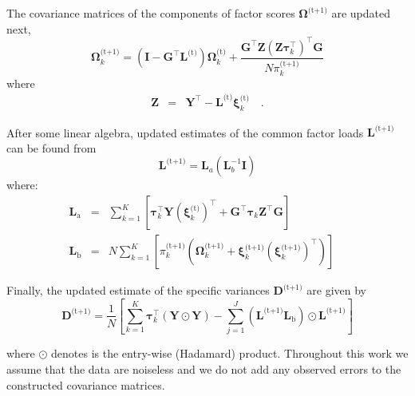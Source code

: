 \documentclass[twocolumn]{aastex62}
\newcommand{\vect}[1]{\boldsymbol{\mathbf{#1}}}
\renewcommand{\vec}[1]{\vect{#1}}
\newcommand{\weight}{\pi}
\newcommand{\data}{\textbf{Y}}
\newcommand{\vecdata}{\vec\data}
\newcommand{\nextstep}{^\textrm{(t+1)}}
\newcommand{\thisstep}{^\textrm{(t)}}
\newcommand{\transpose}{^\intercal}
\newcommand{\eye}{\textbf{I}}
\newcommand{\factorloads}{\textbf{L}}
\newcommand{\specificvariance}{\vec{D}}
\newcommand{\scoremeans}{\vec\xi}
\newcommand{\scorecovs}{\vec\Omega}
\newcommand{\NumData}{N}
\newcommand{\NumComponents}{K}
\newcommand{\numcomponents}{k}
\begin{document}
The covariance matrices of the components of factor scores $\scorecovs\nextstep$
are updated next,
\begin{equation}
	\scorecovs_\numcomponents\nextstep = \left(\eye - \vec{G}\transpose\factorloads\thisstep\right)\scorecovs_\numcomponents\thisstep + \frac{\vec{G}\transpose\vec{Z}\left(\vec{Z}\vec\tau_\numcomponents\transpose\right)\transpose\vec{G}}{N\weight_\numcomponents\nextstep}
\end{equation}
\noindent{}where
\begin{eqnarray}
	\vec{Z} &=& \vecdata\transpose - \factorloads\thisstep\scoremeans_\numcomponents\thisstep \quad .
\end{eqnarray}

After some linear algebra, updated estimates of the common factor loads $\factorloads\nextstep$
can be found from
\begin{equation}
	\factorloads\nextstep = \factorloads_{a}\left(\factorloads_{b}^{-1}\eye\right)
\end{equation}
\noindent{}where:
\begin{eqnarray}
	\factorloads_\textrm{a} &=& \sum_{\numcomponents=1}^{\NumComponents}\left[ \vec\tau_\numcomponents\transpose\vecdata\left(\scoremeans_\numcomponents\thisstep\right)\transpose + 
	\vec{G}\transpose\vec\tau_\numcomponents\vec{Z}\transpose\vec{G}\right] \\
	\factorloads_\textrm{b} &=& N\sum_{\numcomponents=1}^{\NumComponents}\left[\weight_\numcomponents\nextstep\left(\scorecovs_\numcomponents\nextstep + \scoremeans_\numcomponents\nextstep\left(\scoremeans_\numcomponents\nextstep\right)\transpose\right)\right] \quad
\end{eqnarray}


Finally, the updated estimate of the specific variances $\specificvariance\nextstep$ are given
by
\begin{equation}
	\specificvariance\nextstep = \frac{1}{\NumData}\left[\sum^{\NumComponents}_{\numcomponents=1}\vec\tau_\numcomponents\transpose\left(\vecdata\odot\vecdata\right) - \sum_{j=1}^{J}\left(\factorloads\nextstep\factorloads_\textrm{b}\right)\odot\factorloads\nextstep\right]
\end{equation}

\noindent{}where $\odot$ denotes is the entry-wise (Hadamard) product. 
Throughout this work we assume that the data are noiseless and
we do not add any observed errors to the constructed covariance matrices.
\end{document}
